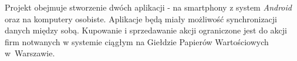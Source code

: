 Projekt obejmuje stworzenie dwóch aplikacji - na smartphony z system \emph{Android} oraz na komputery
osobiste. Aplikacje będą miały możliwość synchronizacji danych między sobą. Kupowanie i sprzedawanie
akcji ograniczone jest do akcji firm notwanych w systemie ciągłym na Giełdzie Papierów Wartościowych
w~Warszawie.

